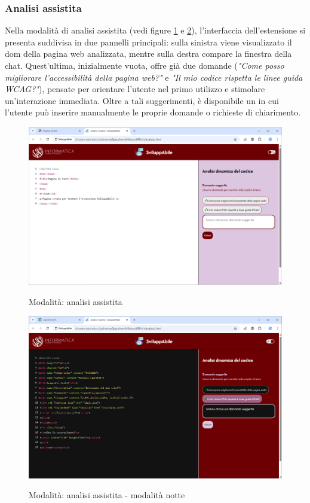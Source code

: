 \subsubsection{Analisi assistita}
\noindent Nella modalità di analisi assistita (vedi figure \ref{fig:aass} e \ref{fig:aass_notte}), l’interfaccia dell’estensione si presenta suddivisa in due pannelli principali: sulla sinistra viene visualizzato il \acrshort{dom} della pagina web analizzata, mentre sulla destra compare la finestra della chat. Quest’ultima, inizialmente vuota, offre già due domande (\textit{"Come posso migliorare l'accessibilità della pagina web?"} e \textit{"Il mio codice rispetta le linee guida WCAG?"}), pensate per orientare l’utente nel primo utilizzo e stimolare un’interazione immediata. Oltre a tali suggerimenti, è disponibile un  in cui l’utente può inserire manualmente le proprie domande o richieste di chiarimento.\\

\begin{figure}[H]
    \centering
    \includegraphics[width=1\linewidth, alt={Modalità di analisi assistita}]{img/analisi_ass.png}
    \caption{Modalità: analisi assistita}\label{fig:aass}
\end{figure}

\begin{figure}[H]
    \centering
    \includegraphics[width=1\linewidth, alt={Modalità di analisi assistita - modalità notte}]{img/analisi_ass_dark.png}
    \caption{Modalità: analisi assistita - modalità notte}\label{fig:aass_notte}
\end{figure}

